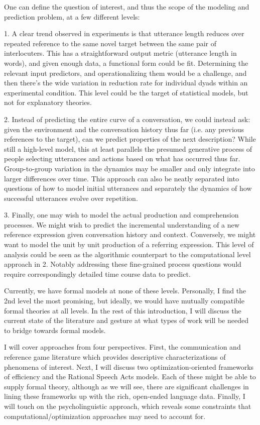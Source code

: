 \documentclass[]{article}
\begin{document}
	One can define the question of interest, and thus the scope of the modeling and prediction problem, at a few different levels:
	
	1. A clear trend observed in experiments is that utterance length reduces over repeated reference to the same novel target between the same pair of interlocuters. This has a straightforward output metric (utterance length in words), and given enough data, a functional form could be fit.  Determining the relevant input predictors, and operationalizing them would be a challenge, and then there's the wide variation in reduction rate for individual dyads within an experimental condition. This level could be the target of statistical models, but not for explanatory theories. 
	
	2. Instead of predicting the entire curve of a conversation, we could instead ask: given the environment and the conversation history thus far (i.e. any previous references to the target), can we predict properties of the next description? While still a high-level model, this at least parallels the presumed generative process of people selecting utterances and actions based on what has occurred thus far. Group-to-group variation in the dynamics may be smaller and only integrate into larger differences over time. This approach can also be neatly separated into questions of how to model initial utterances and separately the dynamics of how successful utterances evolve over repetition. 
	
	3. Finally, one may wish to model the actual production and comprehension processes. We might wish to predict the incremental understanding of a new reference expression given conversation history and context. Conversely, we might want to model the unit by unit production of a referring expression. This level of analysis could be seen as the algorithmic counterpart to the computational level approach in 2. Notably addressing these fine-grained process questions would require correspondingly detailed time course data to predict. 
	
	Currently, we have formal models at none of these levels. Personally, I find the 2nd level the most promising, but ideally, we would have mutually compatible formal theories at all levels. In the rest of this introduction, I will discuss the current state of the literature and gesture at what types of work will be needed to bridge towards formal models. 
	
	I will cover approaches from four perspectives. First, the communication and reference game literature which provides descriptive characterizations of phenomena of interest. Next, I will discuss two optimization-oriented frameworks of efficiency and the Rational Speech Acts models. Each of these might be able to supply formal theory, although as we will see, there are significant challenges in lining these frameworks up with the rich, open-ended language data. Finally, I will touch on the psycholinguistic approach, which reveals some constraints that computational/optimization approaches may need to account for. 
	
\end{document}
